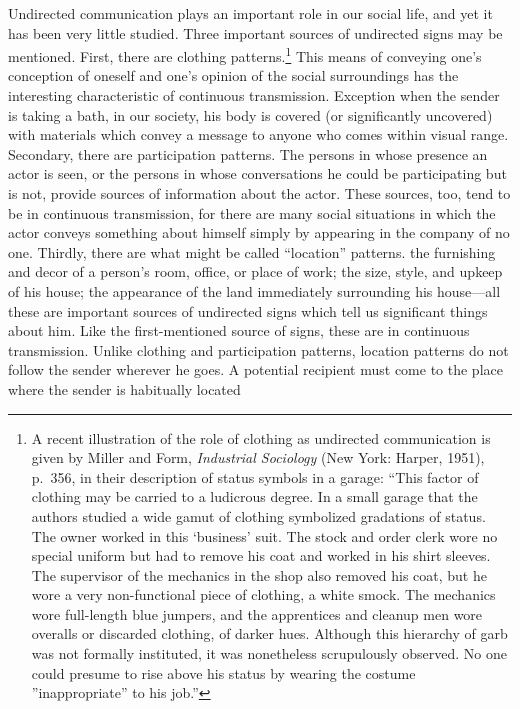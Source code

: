 \documentclass[openany,nobib]{tufte-book}
\begin{document}
Undirected communication plays an important role in our social life, and
yet it has been very little studied. Three important sources of
undirected signs may be mentioned. First, there are clothing
patterns.\footnote{A recent illustration of the role of clothing as
  undirected communication is given by Miller and Form, \emph{Industrial
  Sociology} (New York: Harper, 1951), p.~356, in their description of
  status symbols in a garage: ``This factor of clothing may be carried
  to a ludicrous degree. In a small garage that the authors studied a
  wide gamut of clothing symbolized gradations of status. The owner
  worked in this `business' suit. The stock and order clerk wore no
  special uniform but had to remove his coat and worked in his shirt
  sleeves. The supervisor of the mechanics in the shop also removed his
  coat, but he wore a very non-functional piece of clothing, a white
  smock. The mechanics wore full-length blue jumpers, and the
  apprentices and cleanup men wore overalls or discarded clothing, of
  darker hues. Although this hierarchy of garb was not formally
  instituted, it was nonetheless scrupulously observed. No one could
  presume to rise above his status by wearing the costume
  ''inappropriate'' to his job.''} This means of conveying one's
conception of oneself and one's opinion of the social surroundings has
the interesting characteristic of continuous transmission. Exception
when the sender is taking a bath, in our society, his body is covered
(or significantly uncovered) with materials which convey a message to
anyone who comes within visual range. Secondary, there are participation
patterns. The persons in whose presence an actor is seen, or the persons
in whose conversations he could be participating but is not, provide
sources of information about the actor. These sources, too, tend to be
in continuous transmission, for there are many social situations in
which the actor conveys something about himself simply by appearing in
the company of no one. Thirdly, there are what might be called
``location'' patterns. the furnishing and decor of a person's room,
office, or place of work; the size, style, and upkeep of his house; the
appearance of the land immediately surrounding his house---all these are
important sources of undirected signs which tell us significant things
about him. Like the first-mentioned source of signs, these are in
continuous transmission. Unlike clothing and participation patterns,
location patterns do not follow the sender wherever he goes. A potential
recipient must come to the place where the sender is habitually located
\end{document}
